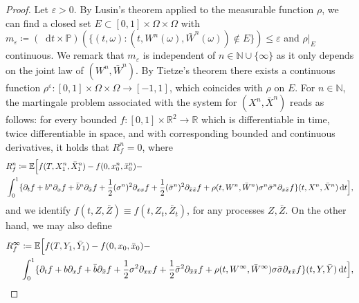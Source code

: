 \documentclass[oneside]{amsart}
\theoremstyle{definition}
\newcommand{\N}{\mathbb N}
\newcommand{\R}{\mathbb R}
\newcommand{\D}{\mathop{}\!\mathrm{d}}
\def\R{{\mathbb R}}
\numberwithin{equation}{section}
\begin{document}
\begin{proof}
Let $\varepsilon > 0$. By Lusin's theorem applied to the measurable function $\rho$, we can find a closed set $E\subset [0,1]\times \Omega \times \Omega$ with $m_\varepsilon \coloneqq (\D t\times \mathbb P)(\{(t,\omega)\colon (t,W^n(\omega),\bar W^n(\omega))\notin E\})\leq \varepsilon$ and $\rho|_E$ continuous. We remark that $m_\varepsilon$ is independent of $n\in \mathbb N\cup\{\infty\}$ as it only depends on the joint law of $(W^n,\bar W^n)$. By Tietze's theorem there exists a continuous function $\rho^\varepsilon\colon [0,1]\times \Omega \times \Omega\to[-1,1]$, which coincides with $\rho$ on $E$.
For $n \in \N$, the martingale problem associated with the system for $(X^n,\bar X^n)$ reads as follows: for every bounded $f\colon [0,1]\times \R^2\to\R$ which is differentiable in time, twice differentiable in space, and with corresponding bounded and continuous derivatives, it holds that $R_f^n=0$, where
\begin{align}
&R_f^n\coloneqq \mathbb E\Bigl[ f(T,X^n_1,\bar X^n_1) - f(0,x^n_0,\bar x^n_0)-  \\ & \int_0^1\{\partial_t f + b^n\partial_xf+ \bar b^n\partial_{\bar x}f+\frac{1}{2}(\sigma^n)^2\partial_{xx}f +\frac{1}{2}(\bar \sigma^n)^2\partial_{\bar x\bar x}f  +\rho(t,W^n,\bar W^n)\sigma^n \bar \sigma^n  \partial_{  x\bar x} f \}(t,X^n,\bar X^n)\D t  \Bigr ],
\end{align}
and we identify $f(t, Z, \bar Z) \equiv f(t, Z_t, \bar Z_t)$, for any processes $Z, \bar Z$. On the other hand, we may also define 
\begin{align}
R_f^\infty &\coloneqq \mathbb E\Bigl[ f(T,Y_1,\bar Y_1) - f(0,x_0,\bar x_0)-  \\ &  \int_0^1\{\partial_t f + b\partial_xf+ \bar b\partial_{\bar x}f+\frac{1}{2}\sigma^2\partial_{xx}f +\frac{1}{2}\bar \sigma^2\partial_{\bar x\bar x}f  +\rho(t,W^\infty,\bar W^\infty)\sigma \bar \sigma  \partial_{  x\bar x} f \}(t,Y,\bar Y)\D t  \Bigr ],
\end{align}

\end{proof}
\end{document}
